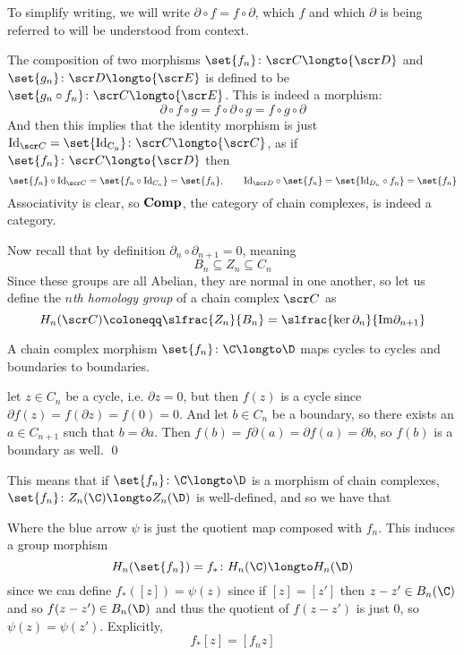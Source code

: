 To simplify writing, we will write $\partial\circ f=f\circ\partial$, which $f$ and which $\partial$ is being referred to will be understood from context.

The composition of two morphisms $\set{f_n}\colon{\scr C}\longto{\scr D}$ and $\set{g_n}\colon{\scr D}\longto{\scr E}$ is defined to be $\set{g_n\circ f_n}\colon{\scr C}\longto{\scr E}$.
This is indeed a morphism:
$$ \partial\circ f\circ g = f\circ\partial\circ g = f\circ g\circ\partial $$
And then this implies that the identity morphism is just ${\rm Id}_{\scr C}=\set{\rm Id_{C_n}}\colon{\scr C}\longto{\scr C}$, as if $\set{f_n}\colon{\scr C}\longto{\scr D}$ then
$$ \set{f_n}\circ{\rm Id}_{\scr C} = \set{f_n\circ {\rm Id}_{C_n}} = \set{f_n},\qquad {\rm Id}_{\scr D}\circ\set{f_n} = \set{{\rm Id}_{D_n}\circ f_n} = \set{f_n} $$
Associativity is clear, so ${\bf Comp}$, the category of chain complexes, is indeed a category.

Now recall that by definition $\partial_n\circ\partial_{n+1}=0$, meaning
$$ B_n \subseteq Z_n \subseteq C_n $$
Since these groups are all Abelian, they are normal in one another, so let us define the {\it $n$th homology group} of a chain complex $\scr C$ as
$$ H_n({\scr C})\coloneqq\slfrac{\displaystyle Z_n}{\displaystyle B_n} = \slfrac{\displaystyle\ker\partial_n}{\displaystyle{\rm Im}\partial_{n+1}} $$

\bprop

    A chain complex morphism $\set{f_n}\colon\C\longto\D$ maps cycles to cycles and boundaries to boundaries.

\eprop

\Proof let $z\in C_n$ be a cycle, i.e. $\partial z=0$, but then $f(z)$ is a cycle since $\partial f(z)=f(\partial z)=f(0)=0$.
And let $b\in C_n$ be a boundary, so there exists an $a\in C_{n+1}$ such that $b=\partial a$.
Then $f(b)=f\partial(a)=\partial f(a)=\partial b$, so $f(b)$ is a boundary as well.
\qed

This means that if $\set{f_n}\colon\C\longto\D$ is a morphism of chain complexes, $\set{f_n}\colon Z_n(\C)\longto Z_n(\D)$ is well-defined, and so we have that

\centerline{\def\diagrowbuf{.5cm}\def\diagcolbuf{.5cm}
}

Where the blue arrow $\psi$ is just the quotient map composed with $f_n$.
This induces a group morphism
$$ H_n(\set{f_n}) = f_*\colon H_n(\C)\longto H_n(\D) $$
since we can define $f_*([z])=\psi(z)$ since if $[z]=[z']$ then $z-z'\in B_n(\C)$ and so $f(z-z')\in B_n(\D)$ and thus the quotient of $f(z-z')$ is just $0$, so $\psi(z)=\psi(z')$.
Explicitly,
$$ f_*[z] = [f_nz] $$

